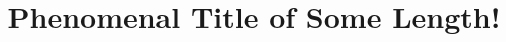 \documentclass[english]{fhnwfactsheet}
\title{Phenomenal Title of Some Length!}
\begin{document}
    \makefactsheet
\end{document}
